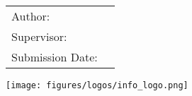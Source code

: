 \begin{titlepage}
\begin{center}
\begin{Huge}
            \@title\par
        \end{Huge}
        \vspace{5mm}
        \begin{Huge}
            \@subtitle\par
        \end{Huge}
        \vspace{10mm}
        \begin{tabular}{l l}
            Author:          & \getAuthor{} \\
            Supervisor:      & \getSupervisor{} \\
            Submission Date: & \getSubmissionDate{} \\
        \end{tabular}
        \vfill
        \texttt{[image: figures/logos/info\_logo.png]}\\
    \end{center}
    \makeatother
\end{titlepage}
